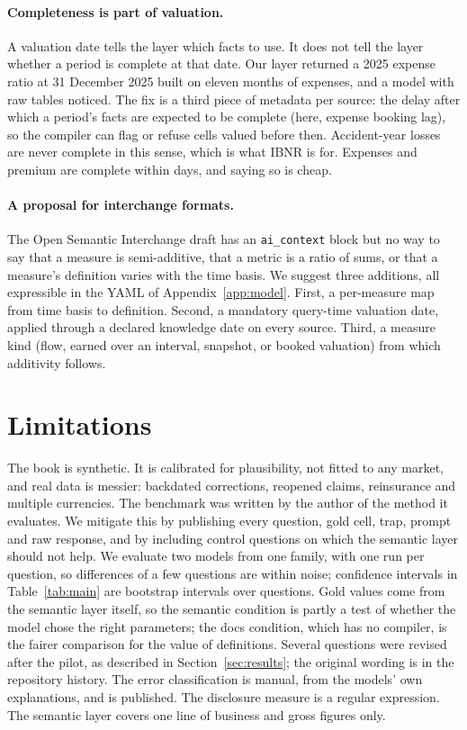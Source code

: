 \documentclass[11pt]{article}
\begin{document}
\paragraph{Completeness is part of valuation.}
A valuation date tells the layer which facts to use. It does not tell the layer whether a period is complete
at that date. Our layer returned a 2025 expense ratio at 31 December 2025 built on eleven months of expenses,
and a model with raw tables noticed. The fix is a third piece of metadata per source: the delay after which a
period's facts are expected to be complete (here, expense booking lag), so the compiler can flag or refuse
cells valued before then. Accident-year losses are never complete in this sense, which is what IBNR is for.
Expenses and premium are complete within days, and saying so is cheap.

\paragraph{A proposal for interchange formats.}
The Open Semantic Interchange draft has an \texttt{ai\_context} block but no way to say that a measure is
semi-additive, that a metric is a ratio of sums, or that a measure's definition varies with the time basis. We
suggest three additions, all expressible in the YAML of Appendix~\ref{app:model}. First, a per-measure map from
time basis to definition. Second, a mandatory query-time valuation date, applied through a declared knowledge
date on every source. Third, a measure kind (flow, earned over an interval, snapshot, or booked valuation)
from which additivity follows.

\section{Limitations}\label{sec:limits}

The book is synthetic. It is calibrated for plausibility, not fitted to any market, and real data is messier:
backdated corrections, reopened claims, reinsurance and multiple currencies. The benchmark was written by the
author of the method it evaluates. We mitigate this by publishing every question, gold cell, trap, prompt and
raw response, and by including control questions on which the semantic layer should not help. We evaluate two
models from one family, with one run per question, so differences of a few questions are within noise; confidence
intervals in Table~\ref{tab:main} are bootstrap intervals over questions. Gold values come from the semantic
layer itself, so the semantic condition is partly a test of whether the model chose the right parameters; the
docs condition, which has no compiler, is the fairer comparison for the value of definitions. Several questions
were revised after the pilot, as described in Section~\ref{sec:results}; the original wording is in the
repository history. The error classification is manual, from the models' own explanations, and is published. The disclosure measure is a regular expression.
The semantic layer covers one line of business and gross figures only.
\end{document}
